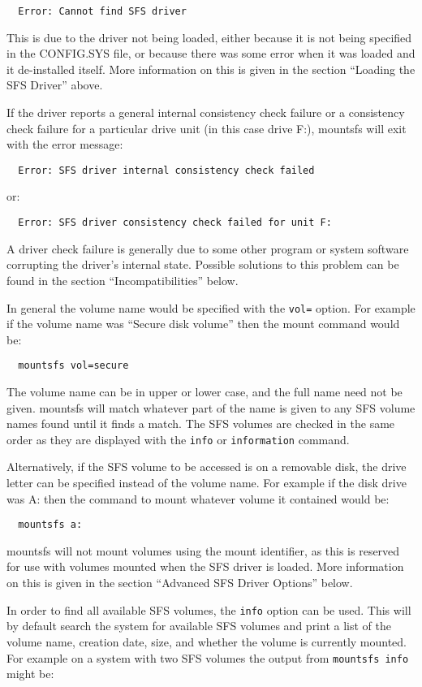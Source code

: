 {\tt  \verb|  |Error: Cannot find SFS driver}

This is due to the driver not being loaded, either because it is not being
specified in the CONFIG.SYS file, or because there was some error when it was
loaded and it de-installed itself.  More information on this is given in the
section ``Loading the SFS Driver'' above.

If the driver reports a general internal consistency check failure or a
consistency check failure for a particular drive unit (in this case drive F:),
mountsfs will exit with the error message:

{\tt  \verb|  |Error: SFS driver internal consistency check failed}

or:

{\tt  \verb|  |Error: SFS driver consistency check failed for unit F:}

A driver check failure is generally due to some other program or system
software corrupting the driver's internal state.  Possible solutions to this
problem can be found in the section ``Incompatibilities'' below.

In general the volume name would be specified with the {\tt vol=} option.  For
example if the volume name was ``Secure disk volume'' then the mount command
would be:

{\tt \verb|  |mountsfs vol=secure}

The volume name can be in upper or lower case, and the full name need not be
given.  mountsfs will match whatever part of the name is given to any SFS
volume names found until it finds a match.  The SFS volumes are checked in the
same order as they are displayed with the {\tt info} or {\tt information} command.

Alternatively, if the SFS volume to be accessed is on a removable disk, the
drive letter can be specified instead of the volume name.  For example if the
disk drive was A: then the command to mount whatever volume it contained would
be:

{\tt \verb|  |mountsfs a:}

mountsfs will not mount volumes using the mount identifier, as this is reserved 
for use with volumes mounted when the SFS driver is loaded.  More information 
on this is given in the section ``Advanced SFS Driver Options'' below.

In order to find all available SFS volumes, the {\tt info} option can be used.
This will by default search the system for available SFS volumes and print a
list of the volume name, creation date, size, and whether the volume is
currently mounted. For example on a system with two SFS volumes the output from
{\tt mountsfs info} might be:

